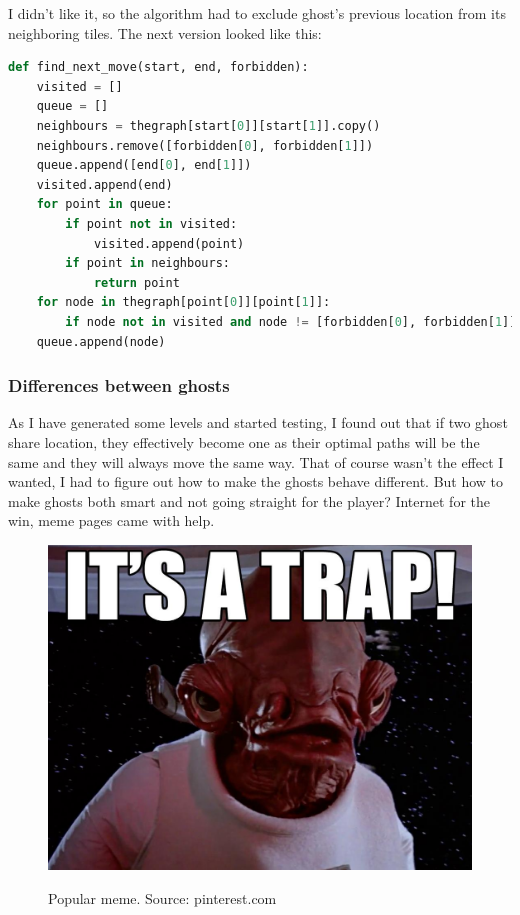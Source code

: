 \documentclass[11pt,a4paper]{report}
\newenvironment{img}{
	\begin{center}
		\begin{figure}[H]
			\begin{center}
			
}{
	\end{center}
		\end{figure}
			\end{center}
}
\begin{document}
					I didn't like it, so the algorithm had to exclude ghost's previous location from its neighboring tiles. The next version looked like this:
					\begin{lstlisting}[language=Python]
def find_next_move(start, end, forbidden):
    visited = []
    queue = []
    neighbours = thegraph[start[0]][start[1]].copy()
    neighbours.remove([forbidden[0], forbidden[1]])
    queue.append([end[0], end[1]])
    visited.append(end)
    for point in queue:
        if point not in visited:
            visited.append(point)
        if point in neighbours:
            return point
    for node in thegraph[point[0]][point[1]]:
        if node not in visited and node != [forbidden[0], forbidden[1]]:
    queue.append(node)
					\end{lstlisting}
				\subsubsection{Differences between ghosts}
					\label{hunting}
					As I have generated some levels and started testing, I found out that if two ghost share location, they effectively become one as their optimal paths will be the same and they will always move the same way. That of course wasn't the effect I wanted, I had to figure out how to make the ghosts behave different. But how to make ghosts both smart and not going straight for the player? Internet for the win, meme pages came with help.
					\begin{img}
						\includegraphics[width=350pt]{images/trap}\\
						\caption{Popular meme. Source: pinterest.com}
						\label{trap}
					\end{img}
\end{document}
